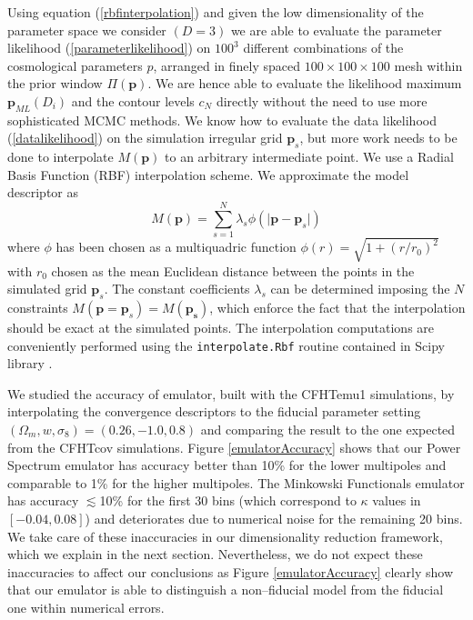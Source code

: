 \documentclass[reprint,aps,prd,superscriptaddress,showkeys,showpacs]{revtex4-1}
\begin{document}
Using equation (\ref{rbfinterpolation}) and given the low dimensionality of the parameter space we consider $(D=3)$ we are able to evaluate the parameter likelihood (\ref{parameterlikelihood}) on $100^3$ different combinations of the cosmological parameters $p$, arranged in finely spaced $100\times100\times100$ mesh within the prior window $\Pi(\mathbf{p})$. We are hence able to evaluate the likelihood maximum $\mathbf{p}_{ML}(D_i)$ and the contour levels $c_N$ directly without the need to use more sophisticated MCMC methods. We know how to evaluate the data likelihood (\ref{datalikelihood}) on the simulation irregular grid $\mathbf{p}_s$, but more work needs to be done to interpolate $M(\mathbf{p})$ to an arbitrary intermediate point. We use a Radial Basis Function (RBF) interpolation scheme. We approximate the model descriptor as
\begin{equation}
\label{rbfinterpolation}
M(\mathbf{p}) = \sum_{s=1}^N \lambda_s\phi(\vert\mathbf{p}-\mathbf{p}_s\vert)
\end{equation}
%
where $\phi$ has been chosen as a multiquadric function $\phi(r)=\sqrt{1+(r/r_0)^2}$ with $r_0$ chosen as the mean Euclidean distance between the points in the simulated grid $\mathbf{p}_s$. The constant coefficients $\lambda_s$ can be determined imposing the $N$ constraints $M(\mathbf{p}=\mathbf{p}_s)=M(\mathbf{p_s})$, which enforce the fact that the interpolation should be exact at the simulated points. The interpolation computations are conveniently performed using the \texttt{interpolate.Rbf} routine contained in Scipy library \citep{scipy}. 

We studied the accuracy of emulator, built with the CFHTemu1 simulations, by interpolating the convergence descriptors to the fiducial parameter setting $(\Omega_m,w,\sigma_8)=(0.26,-1.0,0.8)$ and comparing the result to the one expected from the CFHTcov simulations. Figure \ref{emulatorAccuracy} shows that our Power Spectrum emulator has accuracy better than 10\% for the lower multipoles and comparable to 1\% for the higher multipoles. The Minkowski Functionals emulator has accuracy $\lesssim$10\% for the first 30 bins (which correspond to $\kappa$ values in $[-0.04,0.08]$) and deteriorates due to numerical noise for the remaining 20 bins. We take care of these inaccuracies in our dimensionality reduction framework, which we explain in the next section. Nevertheless, we do not expect these inaccuracies to affect our conclusions as Figure \ref{emulatorAccuracy} clearly show that our emulator is able to distinguish a non--fiducial model from the fiducial one within numerical errors. 
\end{document}
